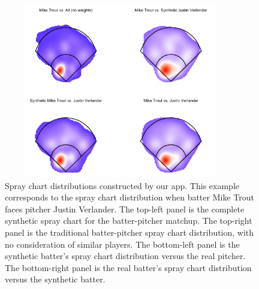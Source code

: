 \documentclass[11pt]{article}
\begin{document}
\begin{figure}
\centering
    \includegraphics[width=4in, height=3in]{combined.png}  
    \caption{Spray chart distributions constructed by our app.  This example 
    corresponds to the spray chart distribution when batter Mike Trout faces 
    pitcher Justin Verlander.
    The top-left panel is the complete synthetic spray chart for 
      the batter-pitcher matchup.
    The top-right panel is the traditional batter-pitcher spray chart 
      distribution, with no consideration of similar players.
    The bottom-left panel is the synthetic batter's spray chart distribution 
      versus the real pitcher. 
    The bottom-right panel is the real batter's spray chart distribution 
      versus the synthetic batter.}
    \label{spraydists}
\end{figure}



\end{document}
